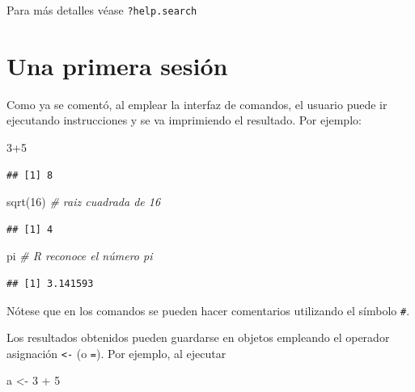 \documentclass[
]{book}
\newenvironment{Shaded}{\begin{snugshade}}{\end{snugshade}}
\newcommand{\CommentTok}[1]{\textcolor[rgb]{0.56,0.35,0.01}{\textit{#1}}}
\newcommand{\DecValTok}[1]{\textcolor[rgb]{0.00,0.00,0.81}{#1}}
\newcommand{\FunctionTok}[1]{\textcolor[rgb]{0.00,0.00,0.00}{#1}}
\newcommand{\NormalTok}[1]{#1}
\newcommand{\OtherTok}[1]{\textcolor[rgb]{0.56,0.35,0.01}{#1}}
\newcommand{\SpecialCharTok}[1]{\textcolor[rgb]{0.00,0.00,0.00}{#1}}
\theoremstyle{break}
\theoremstyle{nonumberplain}
\begin{document}
Para más detalles véase \texttt{?help.search}

\hypertarget{primera-sesion}{%
\section{Una primera sesión}\label{primera-sesion}}

Como ya se comentó, al emplear la interfaz de comandos, el usuario puede ir ejecutando instrucciones y se va imprimiendo el resultado.
Por ejemplo:

\begin{Shaded}
\begin{Highlighting}[]
\DecValTok{3}\SpecialCharTok{+}\DecValTok{5}
\end{Highlighting}
\end{Shaded}

\begin{verbatim}
## [1] 8
\end{verbatim}

\begin{Shaded}
\begin{Highlighting}[]
\FunctionTok{sqrt}\NormalTok{(}\DecValTok{16}\NormalTok{) }\CommentTok{\# raiz cuadrada de 16}
\end{Highlighting}
\end{Shaded}

\begin{verbatim}
## [1] 4
\end{verbatim}

\begin{Shaded}
\begin{Highlighting}[]
\NormalTok{pi }\CommentTok{\# R reconoce el número pi}
\end{Highlighting}
\end{Shaded}

\begin{verbatim}
## [1] 3.141593
\end{verbatim}

Nótese que en los comandos se pueden hacer comentarios utilizando el símbolo \texttt{\#}.

Los resultados obtenidos pueden guardarse en objetos empleando el operador asignación \texttt{\textless{}-} (o \texttt{=}).
Por ejemplo, al ejecutar

\begin{Shaded}
\begin{Highlighting}[]
\NormalTok{a }\OtherTok{\textless{}{-}} \DecValTok{3} \SpecialCharTok{+} \DecValTok{5}
\end{Highlighting}
\end{Shaded}
\end{document}
